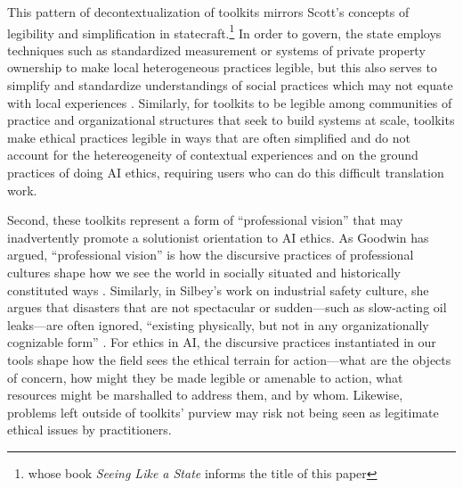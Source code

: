 \documentclass[acmsmall]{acmart}
\begin{document}
This pattern of decontextualization of toolkits mirrors Scott's concepts of legibility and simplification in statecraft.\footnote{whose book \textit{Seeing Like a State} informs the title of this paper} In order to govern, the state employs techniques such as standardized measurement or systems of private property ownership to make local heterogeneous practices legible, but this also serves to simplify and standardize understandings of social practices which may not equate with local experiences \cite{Scott1998seeing}. Similarly, for toolkits to be legible among communities of practice and organizational structures that seek to build systems at scale, toolkits make ethical practices legible in ways that are often simplified and do not account for the hetereogeneity of contextual experiences and on the ground practices of doing AI ethics, requiring users who can do this difficult translation work.

Second, these toolkits represent a form of ``professional vision'' that may inadvertently promote a solutionist orientation to AI ethics. As Goodwin has argued, ``professional vision'' is how the discursive practices of professional cultures shape how we see the world in socially situated and historically constituted ways \cite{goodwin2015professional}. Similarly, in Silbey's work on industrial safety culture, she argues that disasters that are not spectacular or sudden---such as slow-acting oil leaks---are often ignored, ``existing physically, but not in any organizationally cognizable form'' \cite{silbey2009taming}. For ethics in AI, the discursive practices instantiated in our tools shape how the field sees the ethical terrain for action---what are the objects of concern, how might they be made legible or amenable to action, what resources might be marshalled to address them, and by whom. Likewise, problems left outside of toolkits' purview may risk not being seen as legitimate ethical issues by practitioners.
\end{document}
